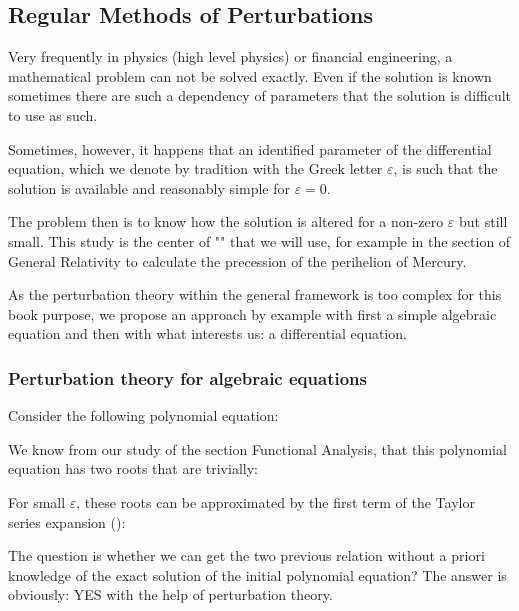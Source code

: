 	\subsection{Regular Methods of Perturbations}\label{regular methods of perturbations}
	Very frequently in physics (high level physics) or financial engineering, a mathematical problem can not be solved exactly. Even if the solution is known sometimes there are such a dependency of parameters that the solution is difficult to use as such.
	
	Sometimes, however, it happens that an identified parameter of the differential equation, which we denote by tradition with the Greek letter $\varepsilon$, is such that the solution is available and reasonably simple for $\varepsilon=0$.
	
	The problem then is to know how the solution is altered for a non-zero $\varepsilon$ but still small. This study is the center of "" that we will use, for example in the section of General Relativity to calculate the precession of the perihelion of Mercury.
	
	As the perturbation theory within the general framework is too complex for this book purpose, we propose an approach by example with first a simple algebraic equation and then with what interests us: a differential equation.
	
	\subsubsection{Perturbation theory for algebraic equations}
	Consider the following polynomial equation:
	
	We know from our study of the section Functional Analysis, that this polynomial equation has two roots that are trivially:
	
	For small $\varepsilon$, these roots can be approximated by the first term of the Taylor series expansion ():
	
	The question is whether we can get the two previous relation without a priori knowledge of the exact solution of the initial polynomial equation? The answer is obviously: YES with the help of perturbation theory.
	
